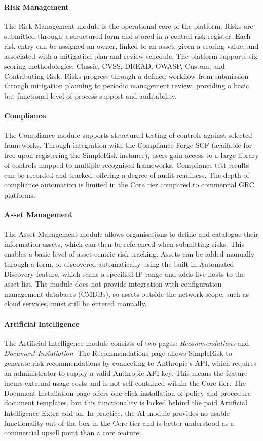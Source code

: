 \paragraph{Risk Management}
The Risk Management module is the operational core of the platform. Risks are submitted
through a structured form and stored in a central risk register. Each risk entry can be
assigned an owner, linked to an asset, given a scoring value, and associated with a
mitigation plan and review schedule. The platform supports six scoring methodologies:
Classic, CVSS, DREAD, OWASP, Custom, and Contributing Risk. Risks progress through a
defined workflow from submission through mitigation planning to periodic management
review, providing a basic but functional level of process support and auditability.

\paragraph{Compliance}
The Compliance module supports structured testing of controls against selected frameworks.
Through integration with the Compliance Forge SCF (available for free upon registering
the SimpleRisk instance), users gain access to a large library of controls mapped to
multiple recognised frameworks. Compliance test results can be recorded and tracked,
offering a degree of audit readiness. The depth of compliance automation is limited in
the Core tier compared to commercial GRC platforms.

\paragraph{Asset Management}
The Asset Management module allows organisations to define and catalogue their information assets, which can then be referenced when submitting risks. This enables a basic level of asset-centric risk tracking. Assets can be added manually through a form, or discovered automatically using the built-in Automated Discovery feature, which scans a specified IP range and adds live hosts to the asset list. The module does not provide integration with configuration management databases (CMDBs), so assets outside the network scope, such
as cloud services, must still be entered manually.

\paragraph{Artificial Intelligence}
The Artificial Intelligence module consists of two pages: \textit{Recommendations} and
\textit{Document Installation}. The Recommendations page allows SimpleRisk to generate
risk recommendations by connecting to Anthropic's API, which requires an administrator
to supply a valid Anthropic API key. This means the feature incurs external usage costs
and is not self-contained within the Core tier. The Document Installation page offers
one-click installation of policy and procedure document templates, but this functionality
is locked behind the paid Artificial Intelligence Extra add-on. In practice, the AI
module provides no usable functionality out of the box in the Core tier and is better
understood as a commercial upsell point than a core feature.

